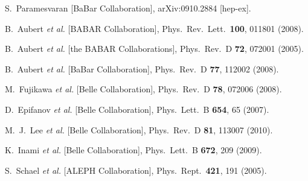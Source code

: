 \documentclass[fleqn,twoside]{article}
\begin{document}
\begin{thebibliography}{99}
  S.~Paramesvaran  [BaBar Collaboration],
  arXiv:0910.2884 [hep-ex].

  B.~Aubert {\it et al.}  [BABAR Collaboration],
  Phys.\ Rev.\ Lett.\  {\bf 100}, 011801 (2008).

  B.~Aubert {\it et al.}  [the BABAR Collaborations],
  Phys.\ Rev.\  D {\bf 72}, 072001 (2005).

  B.~Aubert {\it et al.}  [BaBar Collaboration],
  Phys.\ Rev.\  D {\bf 77}, 112002 (2008).

  M.~Fujikawa {\it et al.}  [Belle Collaboration],
  Phys.\ Rev.\  D {\bf 78}, 072006 (2008).

  D.~Epifanov {\it et al.}  [Belle Collaboration],
  Phys.\ Lett.\  B {\bf 654}, 65 (2007).

  M.~J.~Lee {\it et al.}  [Belle Collaboration],
  Phys.\ Rev.\  D {\bf 81}, 113007 (2010).

  K.~Inami {\it et al.}  [Belle Collaboration],
  Phys.\ Lett.\  B {\bf 672}, 209 (2009).

  S.~Schael {\it et al.}  [ALEPH Collaboration],
  Phys.\ Rept.\  {\bf 421}, 191 (2005).


\end{thebibliography}
\end{document}
